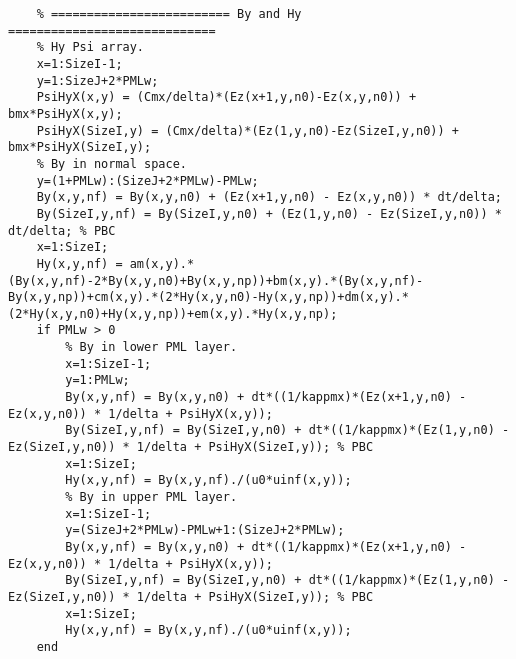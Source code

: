 \begin{lstlisting}
    % ========================= By and Hy =============================
    % Hy Psi array.
    x=1:SizeI-1;
    y=1:SizeJ+2*PMLw;
    PsiHyX(x,y) = (Cmx/delta)*(Ez(x+1,y,n0)-Ez(x,y,n0)) + bmx*PsiHyX(x,y);
    PsiHyX(SizeI,y) = (Cmx/delta)*(Ez(1,y,n0)-Ez(SizeI,y,n0)) + bmx*PsiHyX(SizeI,y);
    % By in normal space.
    y=(1+PMLw):(SizeJ+2*PMLw)-PMLw;
    By(x,y,nf) = By(x,y,n0) + (Ez(x+1,y,n0) - Ez(x,y,n0)) * dt/delta;
    By(SizeI,y,nf) = By(SizeI,y,n0) + (Ez(1,y,n0) - Ez(SizeI,y,n0)) * dt/delta; % PBC
    x=1:SizeI;
    Hy(x,y,nf) = am(x,y).*(By(x,y,nf)-2*By(x,y,n0)+By(x,y,np))+bm(x,y).*(By(x,y,nf)-By(x,y,np))+cm(x,y).*(2*Hy(x,y,n0)-Hy(x,y,np))+dm(x,y).*(2*Hy(x,y,n0)+Hy(x,y,np))+em(x,y).*Hy(x,y,np);
    if PMLw > 0
        % By in lower PML layer.
        x=1:SizeI-1;
        y=1:PMLw;
        By(x,y,nf) = By(x,y,n0) + dt*((1/kappmx)*(Ez(x+1,y,n0) - Ez(x,y,n0)) * 1/delta + PsiHyX(x,y));
        By(SizeI,y,nf) = By(SizeI,y,n0) + dt*((1/kappmx)*(Ez(1,y,n0) - Ez(SizeI,y,n0)) * 1/delta + PsiHyX(SizeI,y)); % PBC
        x=1:SizeI;
        Hy(x,y,nf) = By(x,y,nf)./(u0*uinf(x,y));
        % By in upper PML layer.
        x=1:SizeI-1;
        y=(SizeJ+2*PMLw)-PMLw+1:(SizeJ+2*PMLw);
        By(x,y,nf) = By(x,y,n0) + dt*((1/kappmx)*(Ez(x+1,y,n0) - Ez(x,y,n0)) * 1/delta + PsiHyX(x,y));
        By(SizeI,y,nf) = By(SizeI,y,n0) + dt*((1/kappmx)*(Ez(1,y,n0) - Ez(SizeI,y,n0)) * 1/delta + PsiHyX(SizeI,y)); % PBC
        x=1:SizeI;
        Hy(x,y,nf) = By(x,y,nf)./(u0*uinf(x,y));
    end


\end{lstlisting}
